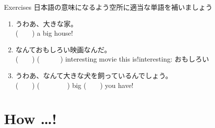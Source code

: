 \documentclass[aspectratio=169,xcolor={dvipsnames,table}]{beamer}
\begin{document}
\begin{frame}[plain]{Exercises}
日本語の意味になるよう空所に適当な単語を補いましょう
 \begin{enumerate}
  \item うわあ、大きな家。\\
	(~~~~) a big house!
  \item なんておもしろい映画なんだ。\\
	(~~~~) (~~~~~~) interesting movie this is!\hfill{\scriptsize interesting: おもしろい}
  \item うわあ、なんて大きな犬を飼っているんでしょう。\\
	(~~~~) (~~~~~~~~) big (~~~~) you have!
 \end{enumerate}
\hfill{\scriptsize {}}

\end{frame}
\section{How \ldots ! }
\end{document}
